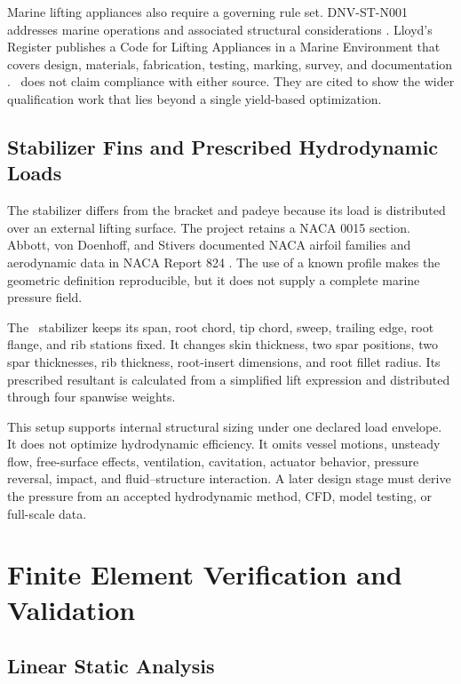 Marine lifting appliances also require a governing rule set. DNV-ST-N001
addresses marine operations and associated structural considerations
\cite{dnvN001}. Lloyd's Register publishes a Code for Lifting Appliances in a
Marine Environment that covers design, materials, fabrication, testing,
marking, survey, and documentation \cite{lrLifting2026}. \NEMO\ does not
claim compliance with either source. They are cited to show the wider
qualification work that lies beyond a single yield-based optimization.

\subsection{Stabilizer Fins and Prescribed Hydrodynamic Loads}
\label{sec:stabilizer-review}

The stabilizer differs from the bracket and padeye because its load is
distributed over an external lifting surface. The project retains a NACA 0015
section. Abbott, von Doenhoff, and Stivers documented NACA airfoil families
and aerodynamic data in NACA Report 824 \cite{abbott1945}. The use of a known
profile makes the geometric definition reproducible, but it does not supply a
complete marine pressure field.

The \NEMO\ stabilizer keeps its span, root chord, tip chord, sweep, trailing
edge, root flange, and rib stations fixed. It changes skin thickness, two spar
positions, two spar thicknesses, rib thickness, root-insert dimensions, and
root fillet radius. Its prescribed resultant is calculated from a simplified
lift expression and distributed through four spanwise weights.

This setup supports internal structural sizing under one declared load
envelope. It does not optimize hydrodynamic efficiency. It omits vessel
motions, unsteady flow, free-surface effects, ventilation, cavitation,
actuator behavior, pressure reversal, impact, and fluid--structure
interaction. A later design stage must derive the pressure from an accepted
hydrodynamic method, CFD, model testing, or full-scale data.

\section{Finite Element Verification and Validation}
\label{sec:linear-static-fea-review}

\subsection{Linear Static Analysis}

